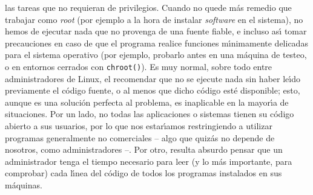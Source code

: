las tareas que no requieran de privilegios. Cuando no quede m\'as remedio que
trabajar como {\it root} (por ejemplo a la hora de instalar {\it software} 
en el sistema), no hemos de ejecutar nada que no provenga de una
fuente fiable, e incluso as\'{\i} tomar precauciones en caso de que el programa
realice funciones m\'{\i}nimamente delicadas para el sistema operativo (por
ejemplo, probarlo antes en una m\'aquina de testeo, o en entornos cerrados con
{\tt chroot()}). Es muy normal, sobre todo entre administradores de Linux, el
recomendar que no se ejecute nada sin haber le\'{\i}do previamente el c\'odigo
fuente, o al menos que dicho c\'odigo est\'e disponible; esto, aunque es una
soluci\'on perfecta al problema, es inaplicable en la mayor\'{\i}a de 
situaciones. Por un lado, no todas las aplicaciones o sistemas tienen su 
c\'odigo abierto a sus usuarios, por lo que nos estar\'{\i}amos restringiendo a
utilizar programas generalmente no comerciales -- algo que quiz\'as no depende
de nosotros, como administradores --. Por otro, resulta absurdo pensar que un
administrador tenga el tiempo necesario para leer (y lo m\'as importante, para
comprobar) cada l\'{\i}nea del c\'odigo de todos los programas instalados
en sus m\'aquinas.
